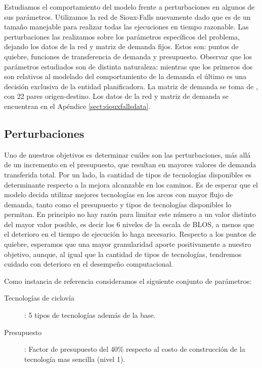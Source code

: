 Estudiamos el comportamiento del modelo frente a perturbaciones en algunos de sus parámetros. Utilizamos la red de Sioux-Falls nuevamente dado que es de un tamaño manejable para realizar todas las ejecuciones en tiempo razonable. Las perturbaciones las realizamos sobre los parámetros específicos del problema, dejando los datos de la red y matriz de demanda fijos. Estos son: puntos de quiebre, funciones de transferencia de demanda y presupuesto. Observar que los parámetros estudiados son de distinta naturaleza: mientras que los primeros dos son relativos al modelado del comportamiento de la demanda el último es una decisión exclusiva de la entidad planificadora. La matriz de demanda se toma de \textcite{Liu2019}, con 22 pares origen-destino. Los datos de la red y matriz de demanda se encuentran en el Apéndice \ref{sect:siouxfallsdata}.

\subsection{Perturbaciones}

Uno de nuestros objetivos es determinar cuáles son las perturbaciones, más allá de un incremento en el presupuesto, que resultan en mayores valores de demanda transferida total. Por un lado, la cantidad de tipos de tecnologías disponibles es determinante respecto a la mejora alcanzable en los caminos. Es de esperar que el modelo decida utilizar mejores tecnologías en los arcos con mayor flujo de demanda, tanto como el presupuesto y tipos de tecnologías disponibles lo permitan. En principio no hay razón para limitar este número a un valor distinto del mayor valor posible, es decir los 6 niveles de la escala de BLOS, a menos que el deterioro en el tiempo de ejecución lo haga necesario. Respecto a los puntos de quiebre, esperamos que una mayor granularidad aporte positivamente a nuestro objetivo, aunque, al igual que la cantidad de tipos de tecnologías, tendremos cuidado con deterioro en el desempeño computacional.

Como instancia de referencia consideramos el siguiente conjunto de parámetros:

\begin{description}
  \item[Tecnologías de ciclovía]: 5 tipos de tecnologías además de la base.
  \item[Presupuesto]: Factor de presupuesto del 40\% respecto al costo de construcción de la tecnología mas sencilla (nivel 1).
\end{description}

